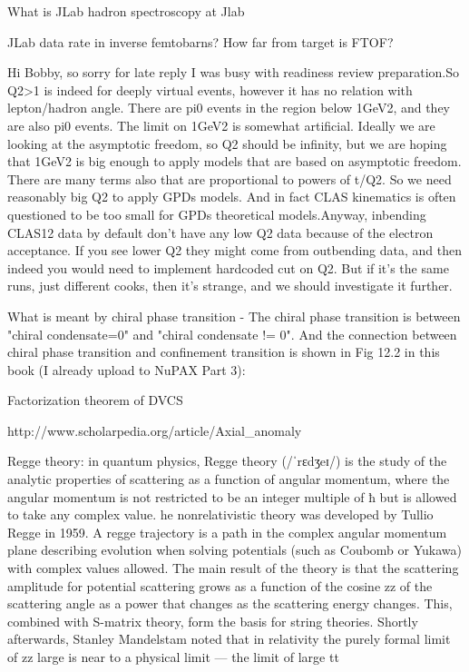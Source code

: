 What is JLab hadron spectroscopy at Jlab

JLab data rate in inverse femtobarns?
How far from target is FTOF?


Hi Bobby, so sorry for late reply I was busy with readiness review preparation.So Q2>1 is indeed for deeply virtual events, however it has no relation with lepton/hadron angle. There are pi0 events in the region below 1GeV2, and they are also pi0 events. The limit on 1GeV2 is somewhat artificial. Ideally we are looking at the asymptotic freedom, so Q2 should be infinity, but we are hoping that 1GeV2 is big enough to apply models that are based on asymptotic freedom. There are many terms also that are proportional to powers of t/Q2. So we need reasonably big Q2 to apply GPDs models. And in fact CLAS kinematics is often questioned to be too small for GPDs theoretical models.Anyway, inbending CLAS12 data by default don't have any low Q2 data because of the electron acceptance. If you see lower Q2 they might come from outbending data, and then indeed you would need to implement hardcoded cut on Q2. But if it's the same runs, just different cooks, then it's strange, and we should investigate it further.






What is meant by chiral phase transition - The chiral phase transition is between "chiral condensate=0" and "chiral condensate != 0". And the connection between chiral phase transition and confinement transition is shown in Fig 12.2 in this book (I already upload to NuPAX Part 3):

Factorization theorem of DVCS


http://www.scholarpedia.org/article/Axial_anomaly

Regge theory: in quantum physics, Regge theory (/ˈrɛdʒeɪ/) is the study of the analytic properties of scattering as a function of angular momentum, where the angular momentum is not restricted to be an integer multiple of ħ but is allowed to take any complex value. he nonrelativistic theory was developed by Tullio Regge in 1959. A regge trajectory is a path in the complex angular momentum plane describing evolution when solving potentials (such as Coubomb or Yukawa) with complex values allowed. The main result of the theory is that the scattering amplitude for potential scattering grows as a function of the cosine {\displaystyle z}z of the scattering angle as a power that changes as the scattering energy changes. This, combined with S-matrix theory, form the basis for string theories. Shortly afterwards, Stanley Mandelstam noted that in relativity the purely formal limit of {\displaystyle z}z large is near to a physical limit — the limit of large {\displaystyle t}t

